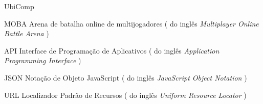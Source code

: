 \begin{listofabbrv}{UbiComp}
	

	  \item [MOBA]        Arena de batalha online de multijogadores ( do inglês \textit{Multiplayer Online Battle Arena} )

  	\item [API]        Interface de Programação de Aplicativos ( do inglês \textit{Application Programming Interface} )
  	\item [JSON]        Notação de Objeto JavaScript ( do inglês \textit{ JavaScript Object Notation} )
  	\item [URL]        Localizador Padrão de Recursos ( do inglês \textit{Uniform Resource Locator} )
    
\end{listofabbrv}